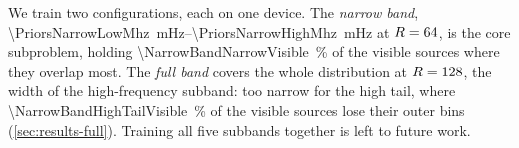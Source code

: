 We train two configurations, each on one device. The \emph{narrow band},
\qtyrange{\PriorsNarrowLowMhz}{\PriorsNarrowHighMhz}{\milli\hertz} at $R=64{}$, is
the core subproblem, holding \qty{\NarrowBandNarrowVisible}{\percent} of the visible sources where they
overlap most. The \emph{full band} covers the whole distribution at $R=128{}$, the width
of the high-frequency subband: too narrow for the high tail, where
\qty{\NarrowBandHighTailVisible}{\percent} of the visible sources lose their outer bins
(\cref{sec:results-full}). Training all five subbands together is left to future work.
